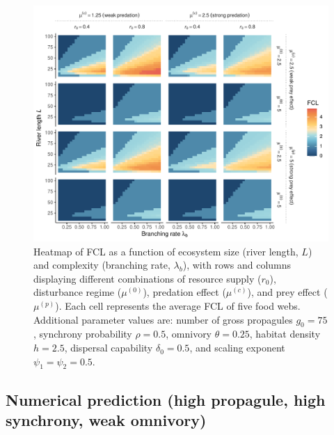 \begin{figure}
\centering
\includegraphics{../data_fmt/fig_rho05_g75_theta025.pdf}
\caption{Heatmap of FCL as a function of ecosystem size (river length,
\(L\)) and complexity (branching rate, \(\lambda_b\)), with rows and
columns displaying different combinations of resource supply (\(r_0\)),
disturbance regime (\(\mu^{(0)}\)), predation effect (\(\mu^{(c)}\)),
and prey effect (\(\mu^{(p)}\)). Each cell represents the average FCL of
five food webs. Additional parameter values are: number of gross
propagules \(g_0=75\), synchrony probability \(\rho=0.5\), omnivory
\(\theta=0.25\), habitat density \(h=2.5\), dispersal capability
\(\delta_0=0.5\), and scaling exponent \(\psi_1=\psi_2=0.5\).}
\end{figure}

\newpage

\subsection{Numerical prediction (high propagule, high synchrony, weak
omnivory)}\label{numerical-prediction-high-propagule-high-synchrony-weak-omnivory}

